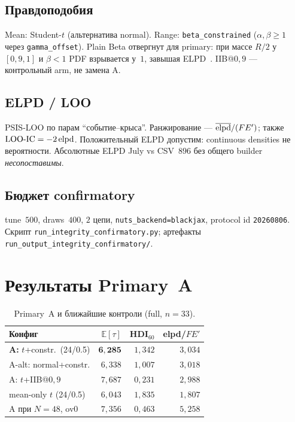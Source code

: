 \documentclass{article}
\begin{document}
\subsection{Правдоподобия}

Mean: Student-$t$ (альтернатива normal). Range:
\texttt{beta\_constrained} ($\alpha,\beta\ge 1$ через
\texttt{gamma\_offset}). Plain Beta отвергнут для primary: при
массе $R/2$ у $[0{,}9,1]$ и $\beta{<}1$ PDF взрывается у~$1$,
завышая ELPD~\cite{Vehtari2017}. IIB@$0{,}9$ --- контрольный arm,
не замена A.

\subsection{ELPD / LOO}

PSIS-LOO по парам ``событие--крыса''. Ранжирование ---
$\overline{\mathrm{elpd}}/(F E')$; также $\mathrm{LOO\text{-}IC}=-2\,\mathrm{elpd}$.
Положительный ELPD допустим: continuous densities не вероятности.
Абсолютные ELPD July vs CSV~$896$ без общего builder
\emph{несопоставимы}.

\subsection{Бюджет confirmatory}

tune~$500$, draws~$400$, $2$ цепи, \texttt{nuts\_backend=blackjax},
protocol id \texttt{20260806}. Скрипт
\texttt{run\_integrity\_confirmatory.py}; артефакты
\texttt{run\_output\_integrity\_confirmatory/}.

\section{Результаты Primary~A}

\begin{table}[t]
\centering
\caption{Primary~A и ближайшие контроли (full, $n{=}33$).}
\label{tab:primary-a}
\small
\begin{tabular}{lrrr}
\toprule
Конфиг & $\mathbb{E}[\tau]$ & HDI$_{60}$ & elpd/$FE'$\\
\midrule
\textbf{A:} $t$+constr.\ (24/0.5) & $\mathbf{6{,}285}$ & $1{,}342$ & $3{,}034$\\
A-alt: normal+constr. & $6{,}338$ & $1{,}007$ & $3{,}018$\\
A: $t$+IIB@$0{,}9$ & $7{,}687$ & $0{,}231$ & $2{,}988$\\
mean-only $t$ (24/0.5) & $6{,}043$ & $1{,}835$ & $1{,}807$\\
A при $N{=}48$, ov$0$ & $7{,}356$ & $0{,}463$ & $5{,}258$\\
\bottomrule
\end{tabular}
\end{table}
\end{document}
